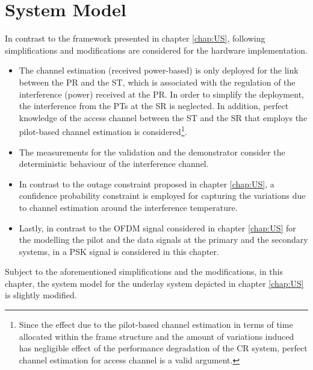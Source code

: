 \section{System Model}
\label{sysmod}
In contrast to the framework presented in chapter \ref{chap:US}, following simplifications and modifications are considered for the hardware implementation.
\begin{itemize}
\item The channel estimation (received power-based) is only deployed for the link between the PR and the ST, which is associated with the regulation of the interference (power) received at the PR. In order to simplify the deployment, the interference from the PTs at the SR is neglected. In addition, perfect knowledge of the access channel between the ST and the SR that employs the pilot-based channel estimation is considered\footnote{Since the effect due to the pilot-based channel estimation in terms of time allocated within the frame structure and the amount of variations induced has negligible effect of the performance degradation of the CR system, perfect channel estimation for access channel is a valid argument.}.  
\item The measurements for the validation and the demonstrator consider the deterministic behaviour of the interference channel.  
\item In contrast to the outage constraint proposed in chapter \ref{chap:US}, a confidence probability constraint is employed for capturing the variations due to channel estimation around the interference temperature. %
\item Lastly, in contrast to the OFDM signal considered in chapter \ref{chap:US} for the modelling the pilot and the data signals at the primary and the secondary systems, in a PSK signal is considered in this chapter. 
\end{itemize}

Subject to the aforementioned simplifications and the modifications, in this chapter, the system model for the underlay system depicted in chapter \ref{chap:US} is slightly modified. 

